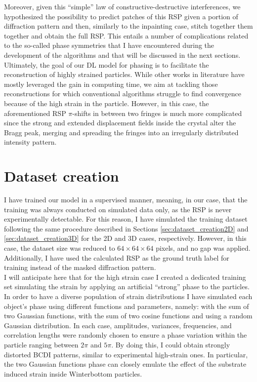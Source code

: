 Moreover, given this ``simple'' law of constructive-destructive interferences, we hypothesized the possibility to predict patches 
of this RSP given a portion of diffraction pattern and then, similarly to the inpainting case, stitch together them together
and obtain the full RSP. This entails a number of complications related to the so-called phase symmetries that I have encountered
during the development of the algorithms and that will be discussed in the next sections. \\
Ultimately, the goal of our DL model for phasing is to facilitate the reconstruction of highly strained particles. While 
other works in literature have mostly leveraged the gain in computing time, we aim at tackling those reconstructions for which 
conventional algorithms struggle to find convergence because of the high strain in the particle.   
However, in this case, the aforementioned RSP $\pi$-shifts in between two fringes is much more complicated since the 
strong and extended displacement fields inside the crystal alter the Bragg peak, merging and spreading the fringes 
into an irregularly distributed intensity pattern. \\

\section{Dataset creation} 

I have trained our model in a supervised manner, meaning, in our case, that the training was always conducted on simulated data 
only, as the RSP is never experimentally detectable. 
For this reason, I have simulated the training dataset following the same procedure described in Sections 
\ref{sec:dataset_creation2D} and \ref{sec:dataset_creation3D} for the 2D and 3D cases, respectively. However, in this
case, the dataset size was reduced to $64\times64\times64$ pixels, and no gap was applied. Additionally, I have used the 
calculated RSP as the ground truth label for training instead of the masked diffraction pattern.\\

I will anticipate here that for the high strain case I created a dedicated training set simulating the strain by applying 
an artificial ``strong'' phase to the particles. In order to have a diverse population of strain distributions I have 
simulated each object's phase using different functions and parameters, namely: with the sum of two Gaussian functions,
with the sum of two cosine functions and using a random Gaussian distribution. In each case, amplitudes, variances, 
frequencies, and correlation lengths were randomly chosen to ensure a phase variation within the particle ranging between 
$2\pi$ and $5\pi$. By doing this, I could obtain strongly distorted BCDI patterns, similar to experimental high-strain ones. 
In particular, the two Gaussian functions phase can closely emulate the effect of the substrate induced strain inside Winterbottom 
particles. 

